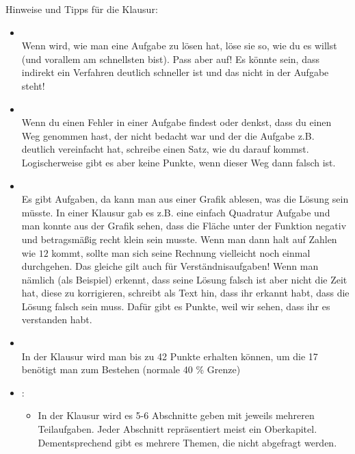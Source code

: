 \documentclass{scrartcl}
\newcommand{\npbase}{../../../}
\begin{document}
	
	
	\newpage
	
	\Large
	Hinweise und Tipps für die Klausur:
	\large
	
	\begin{itemize}
		\item {} \\		
		Wenn  wird, wie man eine Aufgabe zu lösen hat, löse sie so, wie du es willst (und vorallem am schnellsten bist). Pass aber auf! Es könnte sein, dass indirekt ein Verfahren deutlich schneller ist und das nicht in der Aufgabe steht!
		
		\item {} \\		
		Wenn du einen Fehler in einer Aufgabe findest oder denkst, dass du einen Weg genommen hast, der nicht bedacht war und der die Aufgabe z.B. deutlich vereinfacht hat, schreibe einen Satz, wie du darauf kommst. Logischerweise gibt es aber keine Punkte, wenn dieser Weg dann falsch ist.
		
		\item {} \\
		Es gibt Aufgaben, da kann man aus einer Grafik ablesen, was die Lösung sein müsste. In einer Klausur gab es z.B. eine einfach Quadratur Aufgabe und man konnte aus der Grafik sehen, dass die Fläche unter der Funktion negativ und betragsmäßig recht klein sein musste. Wenn man dann halt auf Zahlen wie $12$ kommt, sollte man sich seine Rechnung vielleicht noch einmal durchgehen. Das gleiche gilt auch für Verständnisaufgaben! Wenn man nämlich (als Beispiel) erkennt, dass seine Lösung falsch ist aber nicht die Zeit hat, diese zu korrigieren, schreibt als Text hin, dass ihr erkannt habt, dass die Lösung falsch sein muss. Dafür gibt es Punkte, weil wir sehen, dass ihr es verstanden habt.
		
		\item {}\\
		In der Klausur wird man bis zu 42 Punkte erhalten können, um die 17 benötigt man zum Bestehen (normale 40 \% Grenze)

		\item {}:
		\begin{itemize}
			\item In der Klausur wird es 5-6 Abschnitte geben mit jeweils mehreren Teilaufgaben. Jeder Abschnitt repräsentiert meist ein Oberkapitel. Dementsprechend gibt es mehrere Themen, die nicht abgefragt werden.
			

\end{itemize}
\end{itemize}
\end{document}
